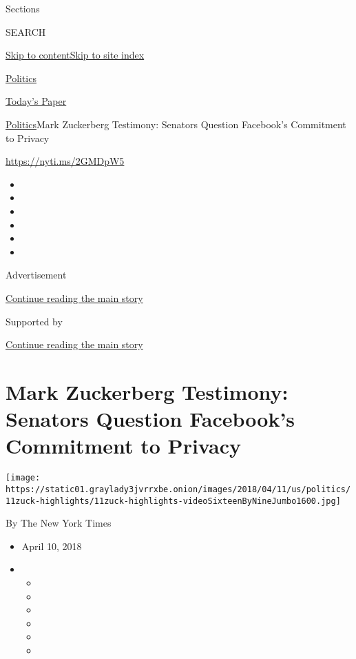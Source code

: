 Sections

SEARCH

\protect\hyperlink{site-content}{Skip to
content}\protect\hyperlink{site-index}{Skip to site index}

\href{https://www.nytimes3xbfgragh.onion/section/politics}{Politics}

\href{https://myaccount.nytimes3xbfgragh.onion/auth/login?response_type=cookie\&client_id=vi}{}

\href{https://www.nytimes3xbfgragh.onion/section/todayspaper}{Today's
Paper}

\href{/section/politics}{Politics}\textbar{}Mark Zuckerberg Testimony:
Senators Question Facebook's Commitment to Privacy

\url{https://nyti.ms/2GMDpW5}

\begin{itemize}
\item
\item
\item
\item
\item
\item
\end{itemize}

Advertisement

\protect\hyperlink{after-top}{Continue reading the main story}

Supported by

\protect\hyperlink{after-sponsor}{Continue reading the main story}

\hypertarget{mark-zuckerberg-testimony-senators-question-facebooks-commitment-to-privacy}{%
\section{Mark Zuckerberg Testimony: Senators Question Facebook's
Commitment to
Privacy}\label{mark-zuckerberg-testimony-senators-question-facebooks-commitment-to-privacy}}

\texttt{[image: https://static01.graylady3jvrrxbe.onion/images/2018/04/11/us/politics/11zuck-highlights/11zuck-highlights-videoSixteenByNineJumbo1600.jpg]}

By The New York Times

\begin{itemize}
\item
  April 10, 2018
\item
  \begin{itemize}
  \item
  \item
  \item
  \item
  \item
  \item
  \end{itemize}
\end{itemize}

